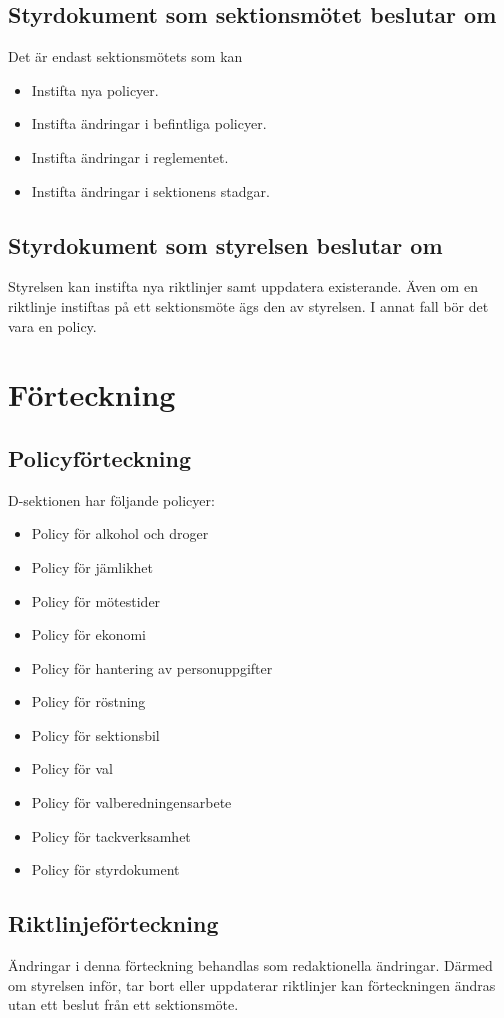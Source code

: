 \documentclass[]{dsekprotokoll}
\begin{document}
\subsection{Styrdokument som sektionsmötet beslutar om}
Det är endast sektionsmötets som kan
\begin{itemize}
    \item Instifta nya policyer.
    \item Instifta ändringar i befintliga policyer.
    \item Instifta ändringar i reglementet.
    \item Instifta ändringar i sektionens stadgar.
\end{itemize}

\subsection{Styrdokument som styrelsen beslutar om}
Styrelsen kan instifta nya riktlinjer samt uppdatera existerande. Även om en riktlinje instiftas på ett sektionsmöte ägs den av styrelsen. I annat fall bör det vara en policy.

\section{Förteckning}
\subsection{Policyförteckning}
D-sektionen har följande policyer:
\begin{itemize}
    \item Policy för alkohol och droger
    \item Policy för jämlikhet
    \item Policy för mötestider
    \item Policy för ekonomi
    \item Policy för hantering av personuppgifter
    \item Policy för röstning
    \item Policy för sektionsbil
    \item Policy för val
    \item Policy för valberedningensarbete
    \item Policy för tackverksamhet
    \item Policy för styrdokument
\end{itemize}
\subsection{Riktlinjeförteckning}
Ändringar i denna förteckning behandlas som redaktionella ändringar. Därmed om styrelsen inför, tar bort eller uppdaterar riktlinjer kan förteckningen ändras utan ett beslut från ett sektionsmöte.
\end{document}
